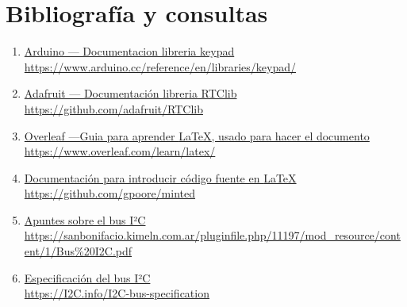 \documentclass{article}
\begin{document}
\section{Bibliografía y consultas}
\begin{enumerate}
	\item \href{https://www.arduino.cc/reference/en/libraries/keypad/} 
		{Arduino --- Documentacion libreria keypad} \\
		\small\url{ https://www.arduino.cc/reference/en/libraries/keypad/}

	\item \href{https://github.com/adafruit/RTClib} 
		{Adafruit --- Documentación libreria RTClib} \\
		\small\url{ https://github.com/adafruit/RTClib}

	\item \href{https://www.overleaf.com/learn/latex/} 
		{Overleaf ---Guia para aprender {\LaTeX}, usado para hacer el documento} \\
		\small\url{ https://www.overleaf.com/learn/latex/}

	\item \href{https://github.com/gpoore/minted} 
		{Documentación para introducir código fuente en {\LaTeX}} \\
		\small\url{ https://github.com/gpoore/minted}

	\item \href{https://sanbonifacio.kimeln.com.ar/pluginfile.php/11197/mod_resource/content/1/Bus%20I2C.pdf}
		{Apuntes sobre el bus I²C} \\
		{\small\url{https://sanbonifacio.kimeln.com.ar/pluginfile.php/11197/mod_resource/content/1/Bus%20I2C.pdf}}

	\item \href{https://I2C.info/I2C-bus-specification}
		{Especificación del bus I²C} \\
		{\small\url{https://I2C.info/I2C-bus-specification}}
\end{enumerate}
\end{document}
